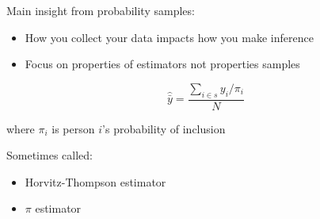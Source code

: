 \documentclass[aspectratio=169]{beamer}
\begin{document}
\begin{frame}

Main insight from probability samples:\\
\begin{itemize}
\item How you collect your data impacts how you make inference
\item Focus on properties of estimators not properties samples
\end{itemize}

\end{frame}
\begin{frame}

\begin{equation*}
\hat{\bar{y}} = \frac{\sum_{i \in s} y_i / \pi_i }{N}
\end{equation*}

where $\pi_i$ is person $i$'s probability of inclusion

\vfill

Sometimes called:
\begin{itemize}
\item Horvitz-Thompson estimator
\item $\pi$ estimator
\end{itemize}

\end{frame}
\end{document}
